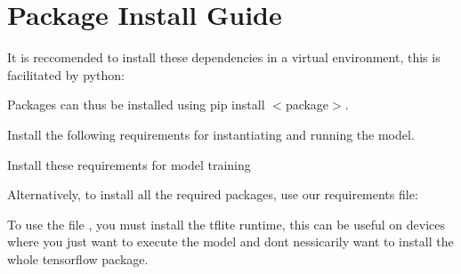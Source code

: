 \chapter{Package Install Guide}
\hypertarget{md_guides_2packages}{}\label{md_guides_2packages}
\label{md_guides_2packages_autotoc_md14}%
%


It is reccomended to install these dependencies in a virtual environment, this is facilitated by {\ttfamily python}\+:


\begin{DoxyCode}{0}

\end{DoxyCode}


Packages can thus be installed using {\ttfamily pip install \texorpdfstring{$<$}{<}package\texorpdfstring{$>$}{>}}.

Install the following requirements for instantiating and running the model.


\begin{DoxyCode}{0}

\end{DoxyCode}


Install these requirements for model training


\begin{DoxyCode}{0}

\end{DoxyCode}


Alternatively, to install all the required packages, use our requirements file\+:


\begin{DoxyCode}{0}

\end{DoxyCode}


To use the file {\ttfamily {}}, you must install the tflite runtime, this can be useful on devices where you just want to execute the model and don\textquotesingle{}t nessicarily want to install the whole tensorflow package.


\begin{DoxyCode}{0}

\end{DoxyCode}
 